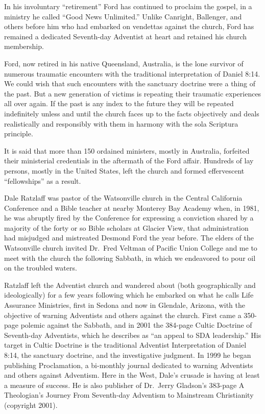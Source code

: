 In his involuntary ``retirement'' Ford has continued to proclaim the gospel,
in a ministry he called ``Good News Unlimited.'' Unlike Canright, Ballenger,
and others before him who had embarked on vendettas against the church, Ford
has remained a dedicated Seventh-day Adventist at heart and retained his
church membership.

Ford, now retired in his native Queensland, Australia, is the lone survivor
of numerous traumatic encounters with the traditional interpretation of
Daniel 8:14. We could wish that such encounters with the sanctuary doctrine
were a thing of the past. But a new generation of victims is repeating their
traumatic experiences all over again. If the past is any index to the future
they will be repeated indefinitely unless and until the church faces up to
the facts objectively and deals realistically and responsibly with them
in harmony with the sola Scriptura principle. 

It is said that more than 150 ordained ministers, mostly in Australia,
forfeited their ministerial credentials in the aftermath of the Ford affair.
Hundreds of lay persons, mostly in the United States, left the church and
formed effervescent ``fellowships'' as a result.

Dale Ratzlaff was pastor of the Watsonville church in the Central California
Conference and a Bible teacher at nearby Monterey Bay Academy when, in 1981,
he was abruptly fired by the Conference for expressing a conviction shared
by a majority of the forty or so Bible scholars at Glacier View, that
administration had misjudged and mistreated Desmond Ford the year before.
The elders of the Watsonville church invited Dr.\ Fred Veltman of Pacific
Union College and me to meet with the church the following Sabbath, in which
we endeavored to pour oil on the troubled waters.

Ratzlaff left the Adventist church and wandered about (both geographically
and ideologically) for a few years following which he embarked on what he
calls Life Assurance Ministries, first in Sedona and now in Glendale,
Arizona, with the objective of warning Adventists and others against the
church. First came a 350-page polemic against the Sabbath, and in 2001 the
384-page Cultic Doctrine of Seventh-day Adventists, which he describes as
``an appeal to SDA leadership.'' His target in Cultic Doctrine is the
traditional Adventist Interpretation of Daniel 8:14, the sanctuary doctrine,
and the investigative judgment. In 1999 he began publishing Proclamation, a
bi-monthly journal dedicated to warning Adventists and others against
Adventism. Here in the West, Dale's crusade is having at least a measure of
success. He is also publisher of Dr.\ Jerry Gladson's 383-page A Theologian's
Journey From Seventh-day Adventism to Mainstream Christianity (copyright
2001).


